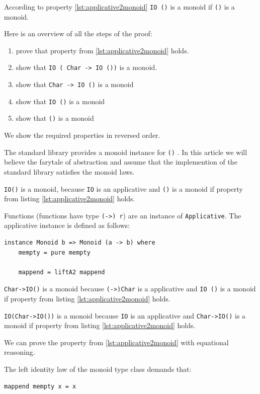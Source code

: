 \documentclass[twoside, a4paper]{article}
\begin{document}
According to property \ref{lst:applicative2monoid} \verb|IO ()| is a monoid if \verb|()| is a monoid.

Here is an overview of all the steps of the proof:
\begin{enumerate}
\item prove that property from \ref{lst:applicative2monoid} holds.
\item show that  \verb|IO ( Char -> IO ())| is a monoid.
\item show that \verb|Char -> IO ()| is a monoid
\item show that \verb|IO ()| is a monoid
\item show that \verb|()| is a monoid
\end{enumerate}

We show the required properties in reversed order.

\begin{etaremune}
\item The standard library provides a monoid instance for \verb|()| \cite{monoid}. In this article we will believe the farytale of abstraction and assume that the implemention of the standard library satisfies the monoid laws.
\item \verb|IO()| is a monoid, because \verb|IO| is an applicative and \verb|()| is a monoid if property from listing \ref{lst:applicative2monoid} holds.
\item Functions (functions have type \verb|(->) r|) are an instance of \verb|Applicative|. The applicative instance is defined as follows:
\begin{verbatim}
instance Monoid b => Monoid (a -> b) where
    mempty = pure mempty

    mappend = liftA2 mappend
\end{verbatim}
 \verb|Char->IO()| is a monoid because \verb|(->)Char| is a applicative and \verb|IO ()| is a monoid if property from listing \ref{lst:applicative2monoid} holds.
\item \verb|IO(Char->IO())| is a monoid because \verb|IO| is an applicative and \verb|Char->IO()| is a monoid if property from listing \ref{lst:applicative2monoid} holds.
\item  We can prove the property from \ref{lst:applicative2monoid} with equational reasoning.
\end{etaremune} 

The left identity law of the monoid type class demands that:
\begin{verbatim}
mappend mempty x = x
\end{verbatim}
\end{document}
